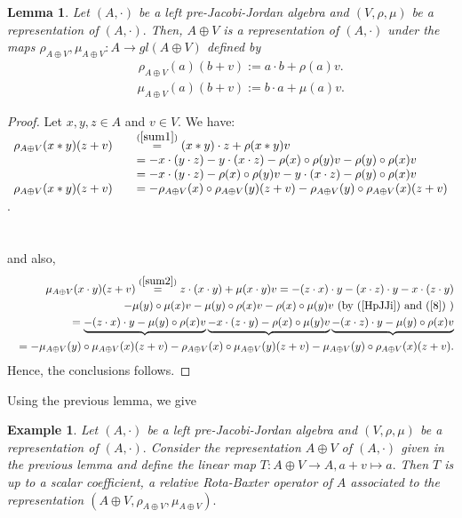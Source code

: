 \documentclass[12pt]{amsart}
\newtheorem{example}[Theorem]{Example}
\newtheorem{lemma}[Theorem]{Lemma}
\begin{document}
\begin{lemma}
Let $(A, \cdot)$ be a left pre-Jacobi-Jordan algebra and $(V,\rho,\mu)$ be a representation of $(A, \cdot).$ Then, $A\oplus V$ is a representation of $(A, \cdot)$ under the maps $\rho_{A\oplus V},\mu_{A\oplus V}: A\rightarrow gl(A\oplus V)$ defined by
\begin{eqnarray}
	&&\rho_{A\oplus V}(a)(b+v):=a\cdot b+\rho(a)v.\label{sum1}
\end{eqnarray}
\begin{eqnarray}
	&&\mu_{A\oplus V}(a)(b+v):=b\cdot a+\mu(a)v.\label{sum2}
\end{eqnarray}
\end{lemma}
\begin{proof}
Let $ x,y,z\in A $ and $ v\in V $. We have: \\
$ \begin{array}{rcl}
	\rho_{A\oplus V}(x\ast y)(z+v)&&\overset{(\ref{sum1})}{=}(x\ast y)\cdot z+\rho(x\ast y)v\\
	&&=-x\cdot (y\cdot z)-y\cdot (x\cdot z)-\rho(x)\circ\rho (y)v-\rho(y)\circ\rho (x)v\\
	&&=-x\cdot (y\cdot z)-\rho(x)\circ\rho (y)v-y\cdot (x\cdot z)-\rho(y)\circ\rho (x)v\\
	\rho_{A\oplus V}(x\ast y)(z+v)&&=-\rho_{A\oplus V}(x)\circ \rho_{A\oplus V}(y)(z+v)-\rho_{A\oplus V}(y)\circ \rho_{A\oplus V}(x)(z+v)
\end{array} $.\\\\\\
and also,
 \begin{eqnarray}
 	&&	\mu_{A\oplus V}(x\cdot y)(z+v)\overset{(\ref{sum2})}{=}z\cdot(x\cdot y)+\mu(x\cdot y)v
=-(z\cdot x)\cdot y-(x\cdot z)\cdot y-x\cdot (z\cdot y)\nonumber\\
&&-\mu(y)\circ \mu(x)v-\mu(y)\circ \rho(x)v
	-\rho(x)\circ \mu(y)v
	\text{ (by (\ref{HpJJi}) and (\ref{8}) )}\nonumber\\
&&	=\underbrace{-(z\cdot x)\cdot y-\mu(y)\circ \rho(x)v}\underbrace{-x\cdot (z\cdot y)-\rho(x)\circ \mu(y)v}\underbrace{-(x\cdot z)\cdot y-\mu(y)\circ \rho(x)v}\nonumber\\
&&	=-\mu_{A\oplus V}(y)\circ \mu_{A\oplus V}(x)(z+v)-\rho_{A\oplus V}(x)\circ \mu_{A\oplus V}(y)(z+v)-\mu_{A\oplus V}(y)\circ \rho_{A\oplus V}(x)(z+v).\nonumber
\end{eqnarray}
Hence, the conclusions follows. 
\end{proof}
Using the previous lemma, we give
\begin{example}
	Let $(A, \cdot)$ be a left pre-Jacobi-Jordan algebra and $(V,\rho,\mu)$ be a representation of $(A, \cdot).$
	Consider the representation $A\oplus V$  of $(A, \cdot)$ given in the previous lemma and
	define the linear map $T: A\oplus V\rightarrow A, a+v\mapsto a.$ Then $T$ is up to a scalar coefficient, a relative Rota-Baxter operator of $A$ associated to the representation $(A\oplus V,\rho_{A\oplus V}, \mu_{A\oplus V}).$
\end{example}
\end{document}
